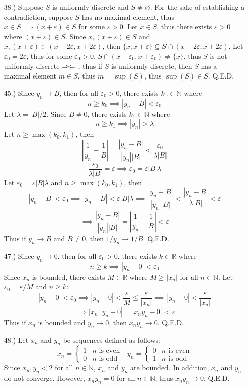 \documentclass[12pt]{article}
\newcommand{\contradiction}{
    \ensuremath{{\Rightarrow\mspace{-2mu}\Leftarrow}}
}
\newcommand{\vertb}[1]{\left\vert#1\right\vert}
\newcommand{\e}{\varepsilon}
\begin{document}
\begin{itemize}
    \pagebreak
    \item [38.)] Suppose $S$ is uniformly discrete and $S\ne\varnothing$. For the sake of establishing a contradiction, suppose $S$ has no maximal element, thus $x\in S\implies(x+\e)\in S$ for some $\e>0$. Let $x\in S$, thus there exists $\e>0$ where $(x+\e)\in S$. Since $x,(x+\e)\in S$ and $x,(x+\e)\in(x-2\e,x+2\e)$, then $\{x,x+\e\}\subseteq S\cap(x-2\e,x+2\e)$. Let $\e_0=2\e$, thus for some $\e_0>0$, $S\cap(x-\e_0,x+\e_0)\ne\{x\}$, thus $S$ is not uniformly discrete\contradiction, thus if $S$ is uniformly discrete, then $S$ has a maximal element $m\in S$, thus $m=\sup(S)$, thus $\sup(S)\in S$. Q.E.D.

    \item [45.)] Since $y_n\to B$, then for all $\e_0>0$, there exists $k_0\in\mathbb{N}$ where
    \[n\geq k_0\implies\vertb{y_n-B}<\e_0\]
    Let $\lambda=\vertb{B}/2$. Since $B\neq0$, there exists $k_1\in\mathbb{N}$ where
    \[n\geq k_1\implies\vertb{y_n}>\lambda\]
    Let $n\geq\max(k_0,k_1)$, then
    \[\vertb{\frac{1}{y_n}-\frac{1}{B}}=\frac{\vertb{y_n-B}}{\vertb{y_n}\vertb{B}}<\frac{\e_0}{\lambda\vertb{B}}\]
    \[\frac{\e_0}{\lambda\vertb{B}}=\e\implies\e_0=\e\vertb{B}\lambda\]
    Let $\e_0=\e\vertb{B}\lambda$ and $n\geq\max(k_0,k_1)$, then
    \[\vertb{y_n-B}<\e_0\implies\vertb{y_n-B}<\e\vertb{B}\lambda\implies \frac{\vertb{y_n-B}}{\vertb{y_n}\vertb{B}}<\frac{\vertb{y_n-B}}{\lambda\vertb{B}}<\e\]
    \[\implies\frac{\vertb{y_n-B}}{\vertb{y_n}\vertb{B}}=\vertb{\frac{1}{y_n}-\frac{1}{B}}<\e\]
    Thus if $y_n\to B$ and $B\neq0$, then $1/y_n\to1/B$. Q.E.D.

    \pagebreak
    \item [47.)] Since $y_n\to0$, then for all $\e_0>0$, there exists $k\in\mathbb{R}$ where
    \[n\geq k\implies\vertb{y_n-0}<\e_0\]
    Since $x_n$ is bounded, there exists $M\in\mathbb{R}$ where $M\geq\vertb{x_n}$ for all $n\in\mathbb{N}$. Let $\e_0=\e/M$ and $n\geq k$:
    \[\vertb{y_n-0}<\e_0\implies\vertb{y_n-0}<\frac{\e}{M}\leq\frac{\e}{\vertb{x_n}}\implies\vertb{y_n-0}<\frac{\e}{\vertb{x_n}}\]
    \[\implies\vertb{x_n}\vertb{y_n-0}=\vertb{x_ny_n-0}<\e\]
    Thus if $x_n$ is bounded and $y_n\to0$, then $x_ny_n\to0$. Q.E.D.

    \item [48.)] Let $x_n$ and $y_n$ be sequences defined as follows:
    \[x_n=\begin{cases}
        1 & n\text{ is even}\\
        0 & n\text{ is odd}
    \end{cases}\ \ \ y_n=\begin{cases}
        0 & n\text{ is even}\\
        1 & n\text{ is odd}
    \end{cases}\]
    Since $x_n,y_n<2$ for all $n\in\mathbb{N}$, $x_n$ and $y_n$ are bounded. In addition, $x_n$ and $y_n$ do not converge. However, $x_ny_n=0$ for all $n\in\mathbb N$, thus $x_ny_n\to0$. Q.E.D.


\end{itemize}
\end{document}
